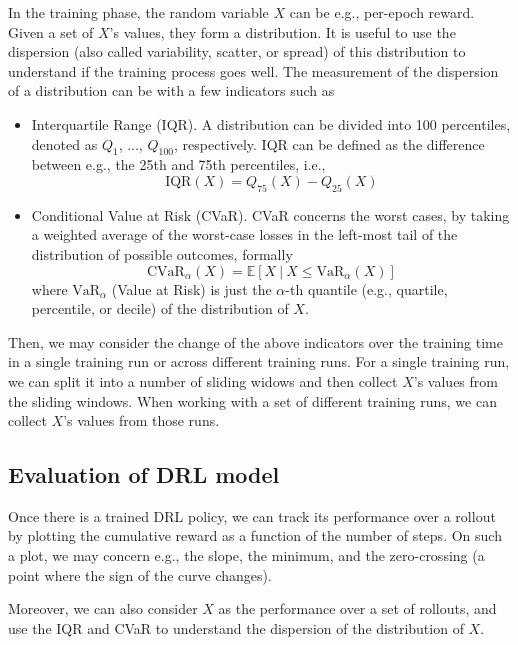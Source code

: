 In the training phase, the random variable $X$ can be e.g., per-epoch reward. Given a set of $X$'s values, they form a distribution. It is useful to use the dispersion (also called variability, scatter, or spread) of this distribution to understand if the training process goes well. The measurement of the dispersion of a distribution can be with a few indicators \cite{DBLP:journals/corr/abs-1912-05663} such as 
\begin{itemize}
    \item Interquartile Range (IQR). A distribution can be divided into 100 percentiles, denoted as $Q_1$, ..., $Q_{100}$, respectively. IQR can be defined as the difference between e.g., the 25th and 75th  percentiles, i.e., 
\begin{equation}
    \text{IQR}(X) = Q_{75}(X) - Q_{25}(X)
\end{equation}
    \item Conditional Value at Risk (CVaR). CVaR concerns the worst cases, by taking a weighted average of the worst-case losses in the left-most tail of the distribution of possible outcomes, formally 
    \begin{equation}
        \text{CVaR}_\alpha(X) = \mathbb{E}[X~|~X\leq \text{VaR}_\alpha(X)]
    \end{equation}
    where $\text{VaR}_\alpha$ (Value at Risk) is just the $\alpha$-th quantile (e.g., quartile, percentile, or decile) of the distribution of $X$.
\end{itemize}

Then, we may consider the change of the above indicators over the training time in a single training run or across different training runs. For a single training run, we can split it into a number of sliding widows and then collect $X$'s values from the sliding windows. When working with a set of different training runs, we can collect $X$'s values from those runs. 



\subsection*{Evaluation of DRL model}

Once there is a trained DRL policy, we can track its performance over a rollout by plotting the cumulative reward as a function of the number of steps. On such a plot, we may concern e.g., the slope, the minimum, and the zero-crossing (a point where the sign of the curve changes). 

Moreover, we can also consider $X$ as the performance over a set of rollouts, and use the IQR and CVaR to understand the dispersion of the distribution of $X$. 




